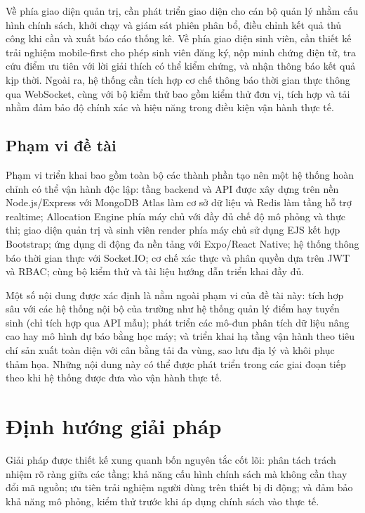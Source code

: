 ﻿\documentclass[a4paper,12pt,openany,oneside]{report}
\begin{document}
Về phía giao diện quản trị, cần phát triển giao diện cho cán bộ quản lý nhằm
cấu hình chính sách, khởi chạy và giám sát phiên phân bổ, điều chỉnh kết quả
thủ công khi cần và xuất báo cáo thống kê. Về phía giao diện sinh viên, cần
thiết kế trải nghiệm mobile-first cho phép sinh viên đăng ký, nộp minh chứng
điện tử, tra cứu điểm ưu tiên với lời giải thích có thể kiểm chứng, và nhận
thông báo kết quả kịp thời. Ngoài ra, hệ thống cần tích hợp cơ chế thông báo
thời gian thực thông qua WebSocket, cùng với bộ kiểm thử bao gồm kiểm thử đơn
vị, tích hợp và tải nhằm đảm bảo độ chính xác và hiệu năng trong điều kiện vận
hành thực tế.

\subsection{Phạm vi đề tài}

Phạm vi triển khai bao gồm toàn bộ các thành phần tạo nên một hệ thống hoàn
chỉnh có thể vận hành độc lập: tầng backend và API được xây dựng trên nền
Node.js/Express với MongoDB Atlas làm cơ sở dữ liệu và Redis làm tầng hỗ trợ
realtime; Allocation Engine phía máy chủ với đầy đủ chế độ mô phỏng và thực
thi; giao diện quản trị và sinh viên render phía máy chủ sử dụng EJS kết hợp
Bootstrap; ứng dụng di động đa nền tảng với Expo/React Native; hệ thống thông
báo thời gian thực với Socket.IO; cơ chế xác thực và phân quyền dựa trên JWT
và RBAC; cùng bộ kiểm thử và tài liệu hướng dẫn triển khai đầy đủ.

Một số nội dung được xác định là nằm ngoài phạm vi của đề tài này: tích hợp
sâu với các hệ thống nội bộ của trường như hệ thống quản lý điểm hay tuyển sinh
(chỉ tích hợp qua API mẫu); phát triển các mô-đun phân tích dữ liệu nâng cao
hay mô hình dự báo bằng học máy; và triển khai hạ tầng vận hành theo tiêu chí
sản xuất toàn diện với cân bằng tải đa vùng, sao lưu địa lý và khôi phục thảm
họa. Những nội dung này có thể được phát triển trong các giai đoạn tiếp theo khi
hệ thống được đưa vào vận hành thực tế.

\section{Định hướng giải pháp}

Giải pháp được thiết kế xung quanh bốn nguyên tắc cốt lõi: phân tách trách
nhiệm rõ ràng giữa các tầng; khả năng cấu hình chính sách mà không cần thay
đổi mã nguồn; ưu tiên trải nghiệm người dùng trên thiết bị di động; và đảm bảo
khả năng mô phỏng, kiểm thử trước khi áp dụng chính sách vào thực tế.
\end{document}
